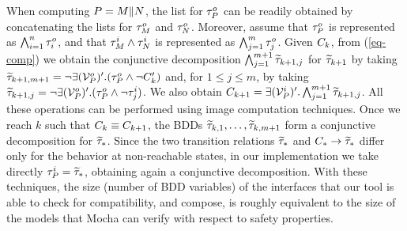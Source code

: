 When computing $P = M \| N$, the list for 
$\tau^o_P$ can be readily obtained by concatenating the lists
for $\tau^o_M$ and $\tau^o_N$. 
Moreover, 
assume that $\tau^o_P$ is represented as $\bigwedge_{i=1}^n \tau^o_i$,
and that $\tau^i_M \wedge \tau^i_N$ is represented as 
$\bigwedge_{j=1}^m \tau^o_j$. 
Given $C_k$, from  (\ref{eq-comp}) we obtain the conjunctive decomposition
$\bigwedge_{j=1}^{m+1} \widetilde{\tau}_{k+1,j}$ for $\widetilde{\tau}_{k+1}$
by taking 
$  \widetilde{\tau}_{k+1,m+1} = \neg \exists ({\cal V}^o_P)' . 
  (\tau^o_P \wedge \neg C'_{k})$ 
and, for $1 \leq j \leq m$, by taking 
$   \widetilde{\tau}_{k+1,j}  = \neg \exists ({\cal V}^o_P)' . 
    (\tau^o_P \wedge \neg \tau^i_j)$. 
We also obtain 
$C_{k+1} = \exists ({\cal V}^i_P)' . \bigwedge_{j=1}^{m+1}
\widetilde{\tau}_{k+1,j}$. 
All these operations can be performed using image computation
techniques.  
Once we reach $k$ such that $C_k \equiv C_{k+1}$, 
the BDDs $\widetilde{\tau}_{k,1}, \ldots, \widetilde{\tau}_{k,m+1}$ form a conjunctive
decomposition for $\widetilde{\tau}_*$. 
Since the two transition relations $\widetilde{\tau}_*$ and $C_* \rightarrow \widetilde{\tau}_*$
differ only for the behavior at non-reachable states, in our
implementation we take directly $\tau^i_P = \widetilde{\tau}_*$, obtaining
again a conjunctive decomposition. 
With these techniques, the size (number of BDD variables) of the
interfaces that our tool is able to check for compatibility, and
compose, is roughly equivalent to the size of the 
models that Mocha \cite{Mocha98} can verify with respect to safety
properties.  


